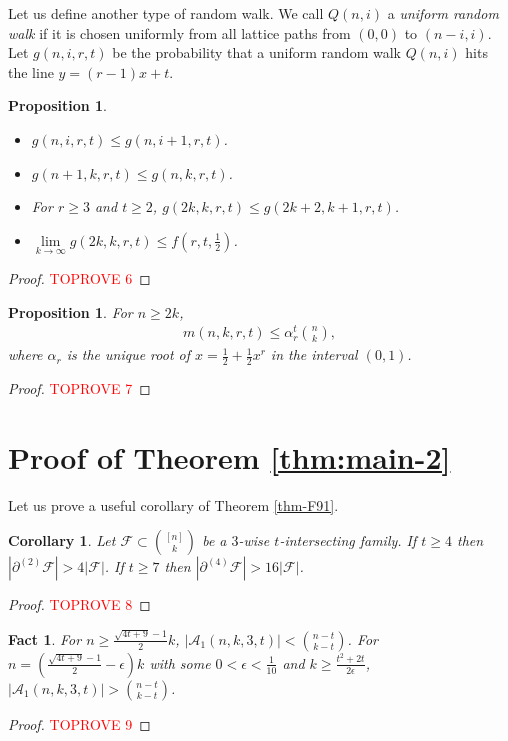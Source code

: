 \documentclass[11pt,a4paper]{article}
\newtheorem{prop}[thm]{Proposition}
\newtheorem{false statement}{False statement}
\newtheorem{cor}[thm]{Corollary}
\newtheorem{fact}[thm]{Fact}
\theoremstyle{definition}
\def\hf{\mathcal{F}}
\def\ha{\mathcal{A}}
\begin{document}
Let us define another type of random walk. We call $Q(n,i)$ a {\it uniform random walk} if it is chosen uniformly from all lattice paths  from $(0,0)$ to $(n-i,i)$. Let $g(n,i,r,t)$ be  the probability that a uniform random walk $Q(n,i)$ hits the line $y=(r-1)x+t$.

\begin{prop}\label{prop-key}
\begin{itemize}
  \item[(i)] $g(n,i,r,t)\leq g(n,i+1,r,t)$.
  \item[(ii)] $g(n+1,k,r,t)\leq g(n,k,r,t)$.
  \item[(iii)] For $r\geq 3$ and $t\geq 2$, $g(2k,k,r,t)\leq g(2k+2,k+1,r,t)$.
  \item[(iv)] $\lim\limits_{k\rightarrow \infty} g(2k,k,r,t)\leq f(r,t,\frac{1}{2})$.
\end{itemize}
\end{prop}

\begin{proof}\textcolor{red}{TOPROVE 6}\end{proof}




\begin{prop}\label{prop-key3}
For $n\geq 2k$,
\begin{align}\label{ineq-key3}
m(n,k,r,t)\leq \alpha_r^t \binom{n}{k},
\end{align}
where $\alpha_r$ is the unique root of  $x = \frac{1}{2}+ \frac{1}{2}x^{r}$ in the interval $(0,1)$.
\end{prop}
\begin{proof}\textcolor{red}{TOPROVE 7}\end{proof}

\section{Proof of Theorem \ref{thm:main-2}}

Let us prove a useful corollary of Theorem \ref{thm-F91}.

\begin{cor}\label{cor-4.1}
Let $\hf\subset \binom{[n]}{k}$ be a $3$-wise $t$-intersecting family. If $t\geq 4$ then $|\partial^{(2)} \hf|>4|\hf|$. If $t\geq 7$ then $|\partial^{(4)} \hf|>16|\hf|$.
\end{cor}

\begin{proof}\textcolor{red}{TOPROVE 8}\end{proof}
\begin{fact}\label{fact-4.7}
For $n\geq \frac{\sqrt{4t+9}-1}{2}k$, $|\ha_1(n,k,3,t)|<\binom{n-t}{k-t}$. For $n=  \left(\frac{\sqrt{4t+9}-1}{2}-\epsilon\right)k$ with some  $0<\epsilon<\frac{1}{10}$ and $k\geq \frac{t^2+2t}{2\epsilon}$, $|\ha_1(n,k,3,t)|>\binom{n-t}{k-t}$.
\end{fact}
\begin{proof}\textcolor{red}{TOPROVE 9}\end{proof}
\end{document}
